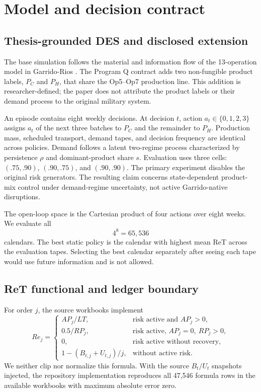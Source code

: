 \documentclass[preprint,12pt]{elsarticle}
\begin{document}
\section{Model and decision contract}

\subsection{Thesis-grounded DES and disclosed extension}

The base simulation follows the material and information flow of the 13-operation model in Garrido-Rios \cite{garrido2017}. The Program Q contract adds two non-fungible product labels, $P_C$ and $P_H$, that share the Op5--Op7 production line. This addition is researcher-defined; the paper does not attribute the product labels or their demand process to the original military system.

An episode contains eight weekly decisions. At decision $t$, action $a_t\in\{0,1,2,3\}$ assigns $a_t$ of the next three batches to $P_C$ and the remainder to $P_H$. Production mass, scheduled transport, demand tapes, and decision frequency are identical across policies. Demand follows a latent two-regime process characterized by persistence $\rho$ and dominant-product share $s$. Evaluation uses three cells: $(.75,.90)$, $(.90,.75)$, and $(.90,.90)$. The primary experiment disables the original risk generators. The resulting claim concerns state-dependent product-mix control under demand-regime uncertainty, not active Garrido-native disruptions.

The open-loop space is the Cartesian product of four actions over eight weeks. We evaluate all
\[
4^8=65{,}536
\]
calendars. The best static policy is the calendar with highest mean ReT across the evaluation tapes. Selecting the best calendar separately after seeing each tape would use future information and is not allowed.

\subsection{ReT functional and ledger boundary}

For order $j$, the source workbooks implement
\[
Re_j=
\begin{cases}
AP_j/LT, & \text{risk active and } AP_j>0,\\
0.5/RP_j, & \text{risk active, } AP_j=0,\ RP_j>0,\\
0, & \text{risk active without recovery},\\
1-(B_{t,j}+U_{t,j})/j, & \text{without active risk}.
\end{cases}
\]
We neither clip nor normalize this formula. With the source $B_t/U_t$ snapshots injected, the repository implementation reproduces all 47,546 formula rows in the available workbooks with maximum absolute error zero.
\end{document}
